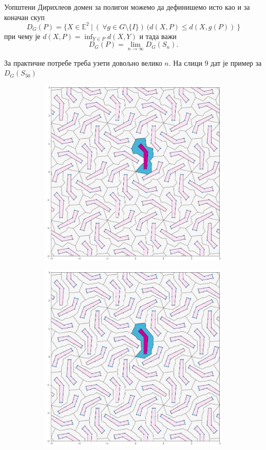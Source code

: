 \documentclass[12pt]{report}
\begin{document}
Уопштени Дирихлеов домен за полигон можемо да дефинишемо исто као и за коначан скуп
$$D_G(P) = \{X \in \mathbb{E}^2\:|\:(\:\forall g \in G \setminus \{I\})\:(d(X,P)\leq d(X,g(P))\:\}$$
при чему је $d(X,P) = \inf_{Y \in P} d(X,Y)$  и тада важи
$$ D_G(P) = \lim _{n\to \infty} D_G(S_n). $$


За практичне потребе треба узети довољно велико $n$. На слици 9 дат је пример за $D_G(S_{50})$

  \begin{figure}[H]
  \begin{subfigure}[b]{0.32\textwidth}
    \includegraphics[width=.9\textwidth]{poligon1.png}
    \label{fig:f7}
  \end{subfigure}
  \begin{subfigure}[b]{0.32\textwidth}
    \includegraphics[width=.9\textwidth]{poligon2.png}

\end{subfigure}
\end{figure}
\end{document}
